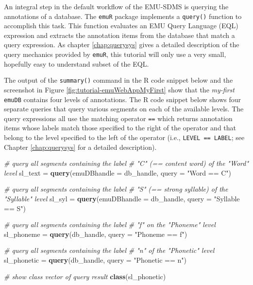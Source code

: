 \documentclass[]{book}
\newenvironment{Shaded}{\begin{snugshade}}{\end{snugshade}}
\newcommand{\CommentTok}[1]{\textcolor[rgb]{0.56,0.35,0.01}{\textit{#1}}}
\newcommand{\DataTypeTok}[1]{\textcolor[rgb]{0.13,0.29,0.53}{#1}}
\newcommand{\KeywordTok}[1]{\textcolor[rgb]{0.13,0.29,0.53}{\textbf{#1}}}
\newcommand{\NormalTok}[1]{#1}
\newcommand{\StringTok}[1]{\textcolor[rgb]{0.31,0.60,0.02}{#1}}
\begin{document}
An integral step in the default workflow of the EMU-SDMS is querying the annotations of a database. The \texttt{emuR} package implements a \texttt{query()} function to accomplish this task. This function evaluates an EMU Query Language (EQL) expression and extracts the annotation items from the database that match a query expression. As chapter \ref{chap:querysys} gives a detailed description of the query mechanics provided by \texttt{emuR}, this tutorial will only use a very small, hopefully easy to understand subset of the EQL.

The output of the \texttt{summary()} command in the R code snippet below and the screenshot in Figure \ref{fig:tutorial-emuWebAppMyFirst} show that the \emph{my-first} \texttt{emuDB} contains four levels of annotations. The R code snippet below shows four separate queries that query various segments on each of the available levels. The query expressions all use the matching operator \texttt{==} which returns annotation items whose labels match those specified to the right of the operator and that belong to the level specified to the left of the operator (i.e., \texttt{LEVEL\ ==\ LABEL}; see Chapter \ref{chap:querysys} for a detailed description).

\begin{Shaded}
\begin{Highlighting}[]
\CommentTok{# query all segments containing the label}
\CommentTok{# "C" (== content word) of the "Word" level}
\NormalTok{sl_text =}\StringTok{ }\KeywordTok{query}\NormalTok{(}\DataTypeTok{emuDBhandle =}\NormalTok{ db_handle,}
                \DataTypeTok{query =} \StringTok{"Word == C"}\NormalTok{)}

\CommentTok{# query all segments containing the label}
\CommentTok{# "S" (== strong syllable) of the "Syllable" level}
\NormalTok{sl_syl =}\StringTok{ }\KeywordTok{query}\NormalTok{(}\DataTypeTok{emuDBhandle =}\NormalTok{ db_handle,}
               \DataTypeTok{query =} \StringTok{"Syllable == S"}\NormalTok{)}

\CommentTok{# query all segments containing the label}
\CommentTok{# "f" on the "Phoneme" level}
\NormalTok{sl_phoneme =}\StringTok{ }\KeywordTok{query}\NormalTok{(db_handle,}
                   \DataTypeTok{query =} \StringTok{"Phoneme == f"}\NormalTok{)}

\CommentTok{# query all segments containing the label}
\CommentTok{# "n" of the "Phonetic" level}
\NormalTok{sl_phonetic =}\StringTok{ }\KeywordTok{query}\NormalTok{(db_handle,}
                    \DataTypeTok{query =} \StringTok{"Phonetic == n"}\NormalTok{)}

\CommentTok{# show class vector of query result}
\KeywordTok{class}\NormalTok{(sl_phonetic)}
\end{Highlighting}
\end{Shaded}
\end{document}
